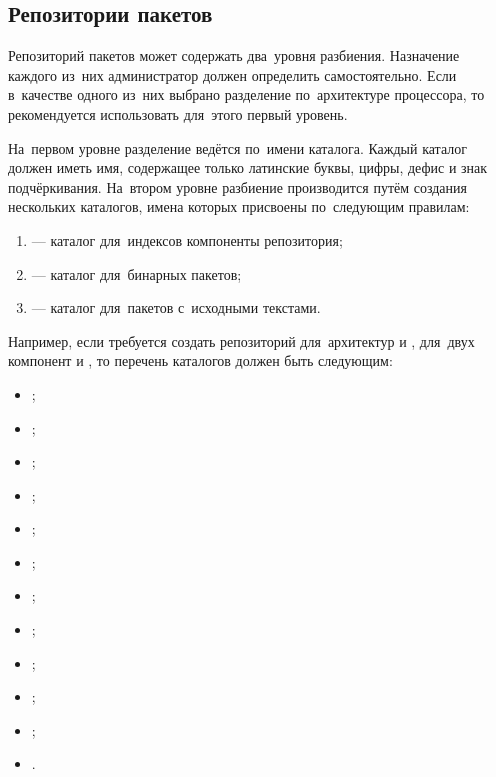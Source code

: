 \subsection{Репозитории пакетов}
\label{repo_format}

Репозиторий пакетов \ds может содержать два~уровня разбиения.
Назначение каждого из~них администратор должен определить самостоятельно.
Если в~качестве одного из~них выбрано разделение по~архитектуре процессора, то рекомендуется использовать для~этого первый уровень.

На~первом уровне разделение ведётся по~имени каталога. 
Каждый каталог должен иметь имя, содержащее только латинские буквы, цифры, дефис и знак подчёркивания.
На~втором уровне разбиение производится путём создания нескольких каталогов,
имена которых присвоены по~следующим правилам:

\begin{enumerate}  

\item {
 --- каталог для~индексов компоненты репозитория;
}

\item {
 --- каталог для~бинарных пакетов;
}

\item {
 --- каталог для~пакетов с~исходными текстами.
}

\end{enumerate}

Например, если требуется создать репозиторий для~архитектур  и , 
для~двух компонент  и ,
то перечень каталогов должен быть следующим:

\begin{itemize}

\item{;}
\item{;}
\item{;}
\item{;}
\item{;}
\item{;}
\item{;}
\item{;}
\item{;}
\item{;}
\item{;}
\item{.}

\end{itemize}

